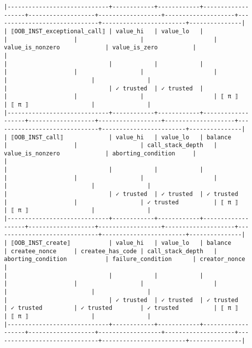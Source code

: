 \documentclass[varwidth=\maxdimen,margin=0.5cm,multi={verbatim}]{standalone}
\begin{document}
\begin{verbatim}
|-----------------------------+------------+------------+-------------------+-------------------+------------------+--------------------+------------------------------+------------------------+---------------|
| ⟦OOB_INST_exceptional_call⟧ | value_hi   | value_lo   |                   |                   |                  |                    | value_is_nonzero             | value_is_zero          |               |
|                             |            |            |                   |                   |                  |                    |                              |                        |               |
|                             | ✓ trusted  | ✓ trusted  |                   |                   |                  |                    | ⟦ π ⟧                        | ⟦ π ⟧                  |               |
|-----------------------------+------------+------------+-------------------+-------------------+------------------+--------------------+------------------------------+------------------------+---------------|
| ⟦OOB_INST_call⟧             | value_hi   | value_lo   | balance           |                   |                  | call_stack_depth   | value_is_nonzero             | aborting_condition     |               |
|                             |            |            |                   |                   |                  |                    |                              |                        |               |
|                             | ✓ trusted  | ✓ trusted  | ✓ trusted         |                   |                  | ✓ trusted          | ⟦ π ⟧                        | ⟦ π ⟧                  |               |
|-----------------------------+------------+------------+-------------------+-------------------+------------------+--------------------+------------------------------+------------------------+---------------|
| ⟦OOB_INST_create⟧           | value_hi   | value_lo   | balance           | createe_nonce     | createe_has_code | call_stack_depth   | aborting_condition           | failure_condition      | creator_nonce |
|                             |            |            |                   |                   |                  |                    |                              |                        |               |
|                             | ✓ trusted  | ✓ trusted  | ✓ trusted         | ✓ trusted         | ✓ trusted        | ✓ trusted          | ⟦ π ⟧                        | ⟦ π ⟧                  |               |
|-----------------------------+------------+------------+-------------------+-------------------+------------------+--------------------+------------------------------+------------------------+---------------|

\end{verbatim}
\end{document}
